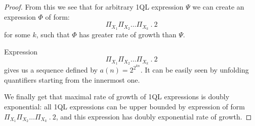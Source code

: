 \documentclass[12pt]{article}
\theoremstyle{definition}
\begin{document}
\begin{proof}
From this we see that for arbitrary 1QL expression $\varPsi$ we can create an expression $\varPhi$ of form:
$$\Pi_{X_1}\Pi_{X_2}\ldots \Pi_{X_k} \ . \ 2$$
for some $k$, such that $\varPhi$ has greater rate of growth than $\varPsi$. 

Expression $$\Pi_{X_1}\Pi_{X_2}\ldots \Pi_{X_k} \ . \ 2$$ gives us a sequence defined by $a(n) = 2^{2^{kn}}$. It can be easily seen by unfolding quantifiers starting from the innermost one.

We finally get that maximal rate of growth of 1QL expressions is doubly exponential: all 1QL expressions can be upper bounded by expression of form $\Pi_{X_1}\Pi_{X_2}\ldots \Pi_{X_k} \ . \ 2$, and this expression has doubly exponential rate of growth.
\end{proof}




\end{document}
